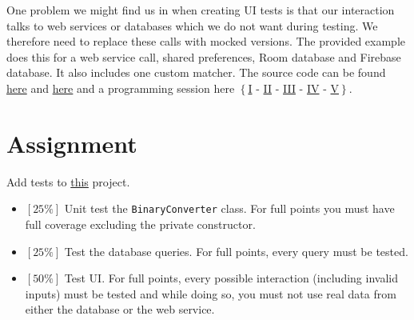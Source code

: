 One problem we might find us in when creating UI tests is that our interaction talks to web services or databases which we do not want during testing. We therefore need to replace these calls with mocked versions. The provided example does this for a web service call, shared preferences, Room database and Firebase database. It also includes one custom matcher. The source code can be found \href{https://github.com/JonSteinn/AndroidDevelopment/tree/master/examples/lab6/espressotest}{here} and \href{https://github.com/JonSteinn/AndroidDevelopment/tree/master/examples/lab6/espressoextra}{here} and a programming session here $\left\{\right.$\href{https://www.youtube.com/watch?v=RW19LV9FG7w}{I} - \href{https://www.youtube.com/watch?v=pxdfimd4MDc}{II} - \href{https://www.youtube.com/watch?v=0OZ_MXSq_OE}{III} - \href{https://www.youtube.com/watch?v=dAdKmsSJB_8}{IV} - \href{https://www.youtube.com/watch?v=G4uXh-SBYIU}{V}$\left.\right\}$.


\section{Assignment}
Add tests to \href{https://github.com/JonSteinn/AndroidDevelopment/raw/master/examples/lab6/test_template.zip}{this} project. 
\begin{itemize}
\item $\left[25\%\right]$ Unit test the \texttt{BinaryConverter} class. For full points you must have full coverage excluding the private constructor.
\item $\left[25\%\right]$ Test the database queries. For full points, every query must be tested.
\item $\left[50\%\right]$ Test UI. For full points, every possible interaction (including invalid inputs) must be tested and while doing so, you must not use real data from either the database or the web service.
\end{itemize}
